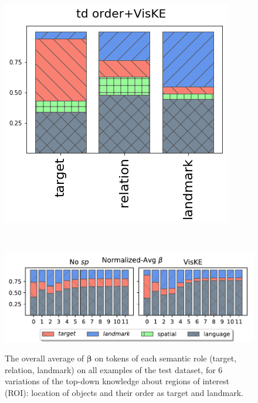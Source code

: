 \begin{figure}[ht!]
\begin{minipage}{0.3\linewidth}
	\end{minipage}%
	\begin{minipage}{0.3\linewidth}
		\centering
		\includegraphics[width=\columnwidth]{studies/inlg2019/figures/results/attentions/models/td_order+VisKE.png}\\
	\end{minipage}\\
	\begin{minipage}{0.9\linewidth}
		\centering
		\includegraphics[width=0.9\columnwidth]{studies/inlg2019/figures/results/attentions/models/legend.pdf}\\
	\end{minipage}%
	\caption{The overall average of $\bm{\beta}$ on tokens of each semantic role (target, relation, landmark) on all examples of the test dataset, for 6 variations of the top-down knowledge about regions of interest (ROI): location of objects and their order as target and landmark.} 
	\label{inlg2019:fig:attention_roles}
\end{figure}

